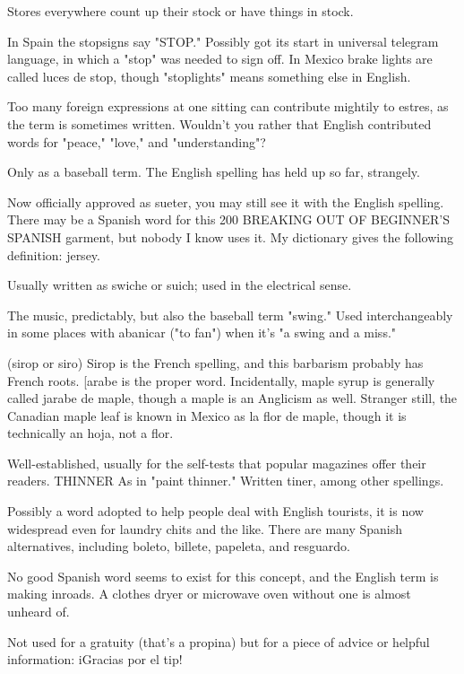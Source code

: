  Stores everywhere count up their stock or have
things in stock.

 In Spain the stopsigns say "STOP." Possibly got its
start in universal telegram language, in which a "stop" was needed to
sign off. In Mexico brake lights are called luces de stop, though "stoplights" means something else in English.

 Too many foreign expressions at one sitting can
contribute mightily to estres, as the term is sometimes written.
Wouldn't you rather that English contributed words for "peace,"
"love," and "understanding"?

 Only as a baseball term. The English spelling has
held up so far, strangely.

 Now officially approved as sueter, you may still
see it with the English spelling. There may be a Spanish word for this
200 BREAKING OUT OF BEGINNER'S SPANISH
garment, but nobody I know uses it. My dictionary gives the following
definition: jersey.

 Usually written as swiche or suich; used in the electrical sense.

 The music, predictably, but also the baseball term
"swing." Used interchangeably in some places with abanicar ("to fan")
when it's "a swing and a miss."

 (sirop or siro) Sirop is the French spelling, and this
barbarism probably has French roots. [arabe is the proper word. Incidentally, maple syrup is generally called jarabe de maple, though a
maple is an Anglicism as well. Stranger still, the Canadian maple leaf
is known in Mexico as la flor de maple, though it is technically an
hoja, not a flor.

 Well-established, usually for the self-tests that popular
magazines offer their readers.
THINNER As in "paint thinner." Written tiner, among other
spellings.

 Possibly a word adopted to help people deal with English tourists, it is now widespread even for laundry chits and the like.
There are many Spanish alternatives, including boleto, billete, papeleta, and resguardo.

 No good Spanish word seems to exist for this concept,
and the English term is making inroads. A clothes dryer or microwave
oven without one is almost unheard of.

 Not used for a gratuity (that's a propina) but for a piece of
advice or helpful information: iGracias por el tip!

